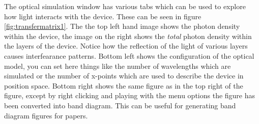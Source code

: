 The optical simulation window has various tabs which can be used to explore how light interacts with the device. These can be seen in figure \ref{fig:transfermatrix1}. The the top left hand image shows the photon density within the device, the image on the right shows the \emph{total} photon density within the layers of the device.  Notice how the reflection of the light of various layers causes interfearance patterns.  Bottom left shows the configuration of the optical model, you can set here things like the number of wavelengths which are simulated or the number of x-points which are used to describe the device in position space. Bottom right shows the same figure as in the top right of the figure, except by right clicking and playing with the menu options the figure has been converted into band diagram.  This can be useful for generating band diagram figures for papers.  
